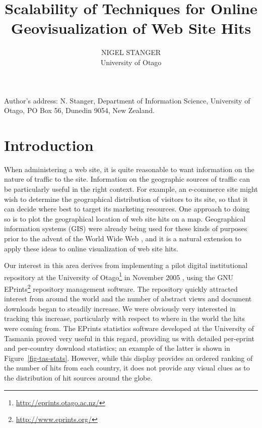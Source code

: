 \documentclass[acmtocl,acmnow]{acmtrans2m}
\title{Scalability of Techniques for Online Geovisualization of Web Site Hits}
\author{NIGEL STANGER \\ University of Otago}
\begin{document}


            
\begin{bottomstuff} 
Author's address: N. Stanger, Department of Information Science,
University of Otago, PO Box 56, Dunedin 9054, New Zealand.
\end{bottomstuff}
            
\maketitle


\section{Introduction}
\label{sec-introduction}

When administering a web site, it is quite reasonable to want
information on the nature of traffic to the site. Information on the
geographic sources of traffic can be particularly useful in the right
context. For example, an e-commerce site might wish to determine the
geographical distribution of visitors to its site, so that it can decide
where best to target its marketing resources. One approach to doing so
is to plot the geographical location of web site hits on a map.
Geographical information systems (GIS) were already being used for these
kinds of purposes prior to the advent of the World Wide Web
\cite{Beau-JR-1991-GIS}, and it is a natural extension to apply these
ideas to online visualization of web site hits.

Our interest in this area derives from implementing a pilot digital
institutional repository at the University of
Otago\footnote{\url{http://eprints.otago.ac.nz/}} in November 2005
\cite{Stan-N-2006-running}, using the GNU
EPrints\footnote{\url{http://www.eprints.org/}} repository management
software. The repository quickly attracted interest from around the
world and the number of abstract views and document downloads began to
steadily increase. We were obviously very interested in tracking this
increase, particularly with respect to where in the world the hits were
coming from. The EPrints statistics software developed at the University
of Tasmania \cite{Sale-A-2006-stats} proved very useful in this regard,
providing us with detailed per-eprint and per-country download
statistics; an example of the latter is shown in
Figure~\ref{fig-tas-stats}. However, while this display provides an
ordered ranking of the number of hits from each country, it does not
provide any visual clues as to the distribution of hit sources around
the globe.
\end{document}
